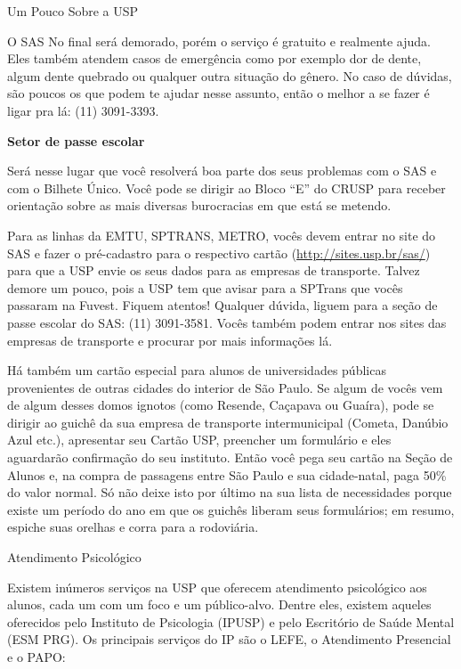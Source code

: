 \begin{secao}{Um Pouco Sobre a USP}
\begin{subsecao}{O SAS}
No final será demorado, porém o serviço é gratuito e realmente ajuda. Eles também atendem casos
de emergência como por exemplo dor de dente, algum dente quebrado ou qualquer outra situação
do gênero. No caso de dúvidas, são poucos os que podem te ajudar nesse assunto, então o melhor
a se fazer é ligar pra lá: (11) 3091-3393.

\textbf{Setor de passe escolar}

Será nesse lugar que você resolverá boa parte dos seus problemas com o SAS e com o
Bilhete Único. Você pode se dirigir ao Bloco “E” do CRUSP para receber orientação sobre
as mais diversas burocracias em que está se metendo.

Para as linhas da EMTU, SPTRANS, METRO, vocês devem entrar no site do SAS e fazer
o pré-cadastro para o respectivo cartão (\url {http://sites.usp.br/sas/}) para que a USP envie os 
seus dados para as empresas de transporte. Talvez demore um pouco, pois a USP tem que
avisar para a SPTrans que vocês passaram na Fuvest. Fiquem atentos! Qualquer dúvida,
liguem para a seção de passe escolar do SAS: (11) 3091-3581. Vocês também podem entrar nos sites 
das empresas de transporte e procurar por mais informações lá.

Há também um cartão especial para alunos de universidades públicas provenientes
de outras cidades do interior de São Paulo. Se algum de vocês vem de algum desses domos
ignotos (como Resende, Caçapava ou Guaíra), pode se dirigir ao guichê da sua empresa de
transporte intermunicipal (Cometa, Danúbio Azul etc.), apresentar seu Cartão USP,
preencher um formulário e eles aguardarão confirmação do seu instituto. Então
você pega seu cartão na Seção de Alunos e, na compra de passagens entre São Paulo
e sua cidade-natal, paga 50\% do valor normal. Só não deixe isto por último na
sua lista de necessidades porque existe um período do ano em que os guichês
liberam seus formulários; em resumo, espiche suas orelhas e corra para a rodoviária.

\end{subsecao}

\begin{subsecao}{Atendimento Psicológico}

Existem inúmeros serviços na USP que oferecem atendimento psicológico
aos alunos, cada um com um foco e um público-alvo. Dentre eles, existem 
aqueles oferecidos pelo Instituto de Psicologia (IPUSP) e pelo Escritório 
de Saúde Mental (ESM PRG).
Os principais serviços do IP são o LEFE, o Atendimento Presencial e o PAPO:


\end{subsecao}
\end{secao}
